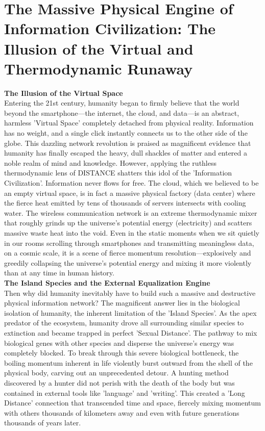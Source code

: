 
\section{The Massive Physical Engine of Information Civilization: The Illusion of the Virtual and Thermodynamic Runaway}
\textbf{The Illusion of the Virtual Space} \\
Entering the 21st century, humanity began to firmly believe that the world beyond the smartphone—the internet, the cloud, and data—is an abstract, harmless 'Virtual Space' completely detached from physical reality. Information has no weight, and a single click instantly connects us to the other side of the globe. This dazzling network revolution is praised as magnificent evidence that humanity has finally escaped the heavy, dull shackles of matter and entered a noble realm of mind and knowledge.
However, applying the ruthless thermodynamic lens of DISTANCE shatters this idol of the 'Information Civilization'. Information never flows for free. The cloud, which we believed to be an empty virtual space, is in fact a massive physical factory (data center) where the fierce heat emitted by tens of thousands of servers intersects with cooling water. The wireless communication network is an extreme thermodynamic mixer that roughly grinds up the universe's potential energy (electricity) and scatters massive waste heat into the void.
Even in the static moments when we sit quietly in our rooms scrolling through smartphones and transmitting meaningless data, on a cosmic scale, it is a scene of fierce momentum resolution—explosively and greedily collapsing the universe's potential energy and mixing it more violently than at any time in human history. \\
\textbf{The Island Species and the External Equalization Engine} \\
Then why did humanity inevitably have to build such a massive and destructive physical information network? The magnificent answer lies in the biological isolation of humanity, the inherent limitation of the 'Island Species'. As the apex predator of the ecosystem, humanity drove all surrounding similar species to extinction and became trapped in perfect 'Sexual Distance'. The pathway to mix biological genes with other species and disperse the universe's energy was completely blocked.
To break through this severe biological bottleneck, the boiling momentum inherent in life violently burst outward from the shell of the physical body, carving out an unprecedented detour. A hunting method discovered by a hunter did not perish with the death of the body but was contained in external tools like 'language' and 'writing'. This created a 'Long Distance' connection that transcended time and space, fiercely mixing momentum with others thousands of kilometers away and even with future generations thousands of years later.
